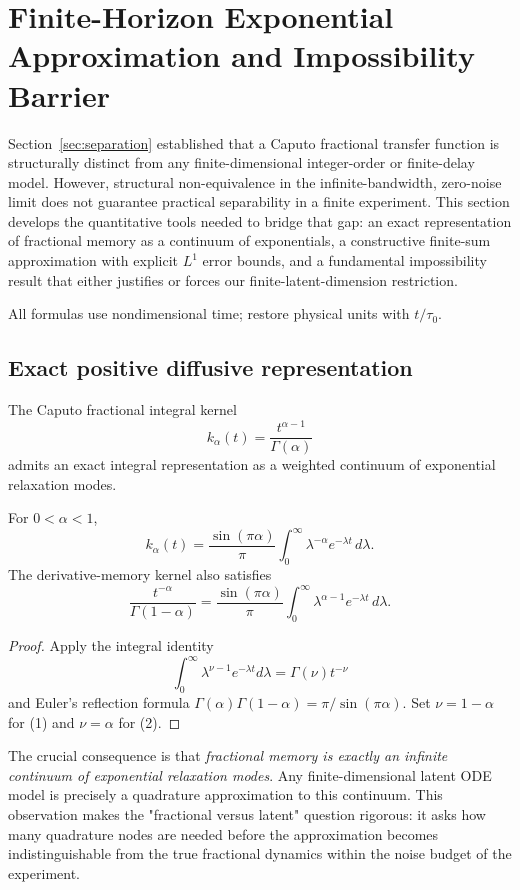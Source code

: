 \section{Finite-Horizon Exponential Approximation and Impossibility Barrier}
\label{sec:approximation}

Section~\ref{sec:separation} established that a Caputo fractional transfer function is structurally distinct from any finite-dimensional integer-order or finite-delay model. However, structural non-equivalence in the infinite-bandwidth, zero-noise limit does not guarantee practical separability in a finite experiment. This section develops the quantitative tools needed to bridge that gap: an exact representation of fractional memory as a continuum of exponentials, a constructive finite-sum approximation with explicit \(L^1\) error bounds, and a fundamental impossibility result that either justifies or forces our finite-latent-dimension restriction.

All formulas use nondimensional time; restore physical units with \(t/\tau_0\).

\subsection{Exact positive diffusive representation}

The Caputo fractional integral kernel
\[
k_\alpha(t) = \frac{t^{\alpha-1}}{\Gamma(\alpha)}
\]
admits an exact integral representation as a weighted continuum of exponential relaxation modes.

\begin{theorem}
\label{thm:T8}
For \(0 < \alpha < 1\),
\[
\boxed{
k_\alpha(t) = \frac{\sin(\pi\alpha)}{\pi}
\int_0^\infty \lambda^{-\alpha} e^{-\lambda t} \, d\lambda.
}
\tag{1}
\]
The derivative-memory kernel also satisfies
\[
\boxed{
\frac{t^{-\alpha}}{\Gamma(1-\alpha)}
= \frac{\sin(\pi\alpha)}{\pi}
\int_0^\infty \lambda^{\alpha-1} e^{-\lambda t} \, d\lambda.
}
\tag{2}
\]
\end{theorem}

\begin{proof}
Apply the integral identity
\[
\int_0^\infty \lambda^{\nu-1} e^{-\lambda t} d\lambda = \Gamma(\nu) t^{-\nu}
\]
and Euler's reflection formula \(\Gamma(\alpha)\Gamma(1-\alpha) = \pi / \sin(\pi\alpha)\). Set \(\nu = 1-\alpha\) for (1) and \(\nu = \alpha\) for (2).
\end{proof}

The crucial consequence is that \emph{fractional memory is exactly an infinite continuum of exponential relaxation modes}. Any finite-dimensional latent ODE model is precisely a quadrature approximation to this continuum. This observation makes the "fractional versus latent" question rigorous: it asks how many quadrature nodes are needed before the approximation becomes indistinguishable from the true fractional dynamics within the noise budget of the experiment.

